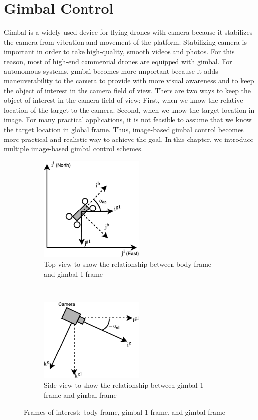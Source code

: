 \chapter{Gimbal Control}
\label{chp:chapter2}
\graphicspath{{figures/}{figures/chapter2/}}
Gimbal is a widely used device for flying drones with camera because it stabilizes the camera from vibration and movement of the platform. Stabilizing camera is important in order to take high-quality, smooth videos and photos. For this reason, most of high-end commercial drones are equipped with gimbal. For autonomous systems, gimbal becomes more important because it adds maneuverability to the camera to provide with more visual awareness and to keep the object of interest in the camera field of view. There are two ways to keep the object of interest in the camera field of view: First, when we know the relative location of the target to the camera. Second, when we know the target location in image. For many practical applications, it is not feasible to assume that we know the target location in global frame. Thus, image-based gimbal control becomes more practical and realistic way to achieve the goal. In this chapter, we introduce multiple image-based gimbal control schemes.

\begin{figure}[htbp]
    \centering
    \begin{subfigure}[t]{0.5\textwidth}
    	\centering
    	\includegraphics[width=2in]{images/chapter2/gimbal1_frame}
    	\caption{Top view to show the relationship between body frame and gimbal-1 frame}
    \end{subfigure}%
    ~
    \begin{subfigure}[t]{0.5\textwidth}
    	\centering
    	\includegraphics[width=2in]{images/chapter2/gimbal_frame}
    	\caption{Side view to show the relationship between gimbal-1 frame and gimbal frame}
    \end{subfigure}
    \caption{Frames of interest: body frame, gimbal-1 frame, and gimbal frame}
    \label{gimbal_frame}
\end{figure}

